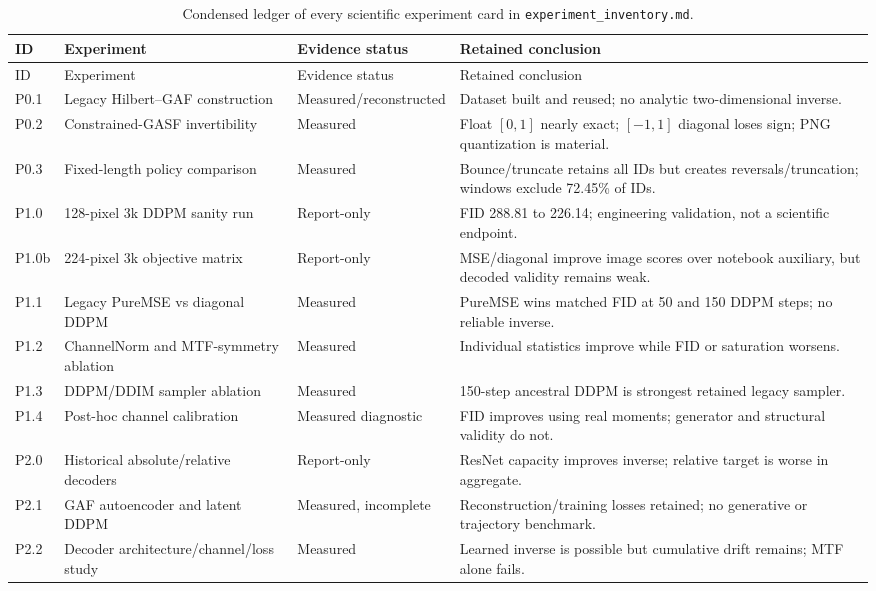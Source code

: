 \documentclass[12pt,a4paper,oneside]{report}
\begin{document}
\small
\begin{longtable}{L{0.10\textwidth}L{0.28\textwidth}L{0.16\textwidth}L{0.39\textwidth}}
\caption{Condensed ledger of every scientific experiment card in \texttt{experiment\_inventory.md}.}\label{tab:ledger}\\
\toprule
ID & Experiment & Evidence status & Retained conclusion \\
\midrule
\endfirsthead
\toprule
ID & Experiment & Evidence status & Retained conclusion \\
\midrule
\endhead
P0.1 & Legacy Hilbert--GAF construction & Measured/reconstructed & Dataset built and reused; no analytic two-dimensional inverse. \\
P0.2 & Constrained-GASF invertibility & Measured & Float $[0,1]$ nearly exact; $[-1,1]$ diagonal loses sign; PNG quantization is material. \\
P0.3 & Fixed-length policy comparison & Measured & Bounce/truncate retains all IDs but creates reversals/truncation; windows exclude 72.45\% of IDs. \\
P1.0 & 128-pixel 3k DDPM sanity run & Report-only & FID 288.81 to 226.14; engineering validation, not a scientific endpoint. \\
P1.0b & 224-pixel 3k objective matrix & Report-only & MSE/diagonal improve image scores over notebook auxiliary, but decoded validity remains weak. \\
P1.1 & Legacy PureMSE vs diagonal DDPM & Measured & PureMSE wins matched FID at 50 and 150 DDPM steps; no reliable inverse. \\
P1.2 & ChannelNorm and MTF-symmetry ablation & Measured & Individual statistics improve while FID or saturation worsens. \\
P1.3 & DDPM/DDIM sampler ablation & Measured & 150-step ancestral DDPM is strongest retained legacy sampler. \\
P1.4 & Post-hoc channel calibration & Measured diagnostic & FID improves using real moments; generator and structural validity do not. \\
P2.0 & Historical absolute/relative decoders & Report-only & ResNet capacity improves inverse; relative target is worse in aggregate. \\
P2.1 & GAF autoencoder and latent DDPM & Measured, incomplete & Reconstruction/training losses retained; no generative or trajectory benchmark. \\
P2.2 & Decoder architecture/channel/loss study & Measured & Learned inverse is possible but cumulative drift remains; MTF alone fails. \\

\end{longtable}
\end{document}
